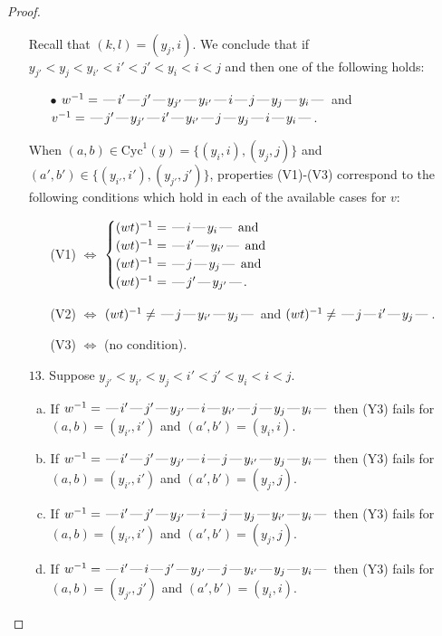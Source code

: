 \documentclass[10pt]{article}
\theoremstyle{definition}
\theoremstyle{definition}
\def\dash{\text{\hspace{0.5mm}---\hspace{0.5mm}}}
\def\Cyc{\mathrm{Cyc}}
\begin{document}
\begin{proof}
\begin{enumerate}
\begin{enumerate}[(a)]
\end{enumerate}
Recall that $(k,l) = (y_j,i)$.
We conclude that if $y_{j'} < y_j < y_{i'} < i' < j' < y_i < i < j$ and then one of the following holds:
\begin{enumerate}
\item[$\bullet$] $w^{-1} = \dash i'\dash j'\dash y_{j'}\dash y_{i'}\dash i\dash j\dash y_j\dash y_i\dash $ and $v^{-1} = \dash j'\dash y_{j'}\dash i'\dash y_{i'}\dash j\dash y_j\dash i\dash y_i\dash $.
\end{enumerate}
When $(a,b)\in\Cyc^1(y)=\{(y_i,i),(y_j,j)\}$ and $(a',b')\in\{(y_{i'},i'),(y_{j'},j')\}$,
properties (V1)-(V3) correspond to the following conditions which hold in
each of the available cases for $v$:
\begin{enumerate}
\item[](V1) $\Leftrightarrow$ $\begin{cases}\text{$(wt)^{-1} = \dash i \dash y_i \dash$}\text{ and }\\
\text{$(wt)^{-1} = \dash i' \dash y_{i'} \dash$}\text{ and }\\
\text{$(wt)^{-1} = \dash j \dash y_j \dash$}\text{ and }\\
\text{$(wt)^{-1} = \dash j' \dash y_{j'} \dash$}.\end{cases}$
\item[](V2) $\Leftrightarrow$ $(wt)^{-1} \neq \dash j \dash y_{i'} \dash y_j \dash$ and $(wt)^{-1}\neq \dash j \dash i' \dash y_j \dash$.
\item[](V3) $\Leftrightarrow$ (no condition).
\end{enumerate}
\item[$13$.] Suppose $y_{j'} < y_{i'} < y_j < i' < j' < y_i < i < j$.
\begin{enumerate}[(a)]
\item If $w^{-1} = \dash i'\dash j'\dash y_{j'}\dash i\dash y_{i'}\dash j\dash y_j\dash y_i\dash $ then (Y3) fails for $(a,b)=(y_{i'},i')$ and $(a',b')=(y_i,i)$.
\item If $w^{-1} = \dash i'\dash j'\dash y_{j'}\dash i\dash j\dash y_{i'}\dash y_j\dash y_i\dash $ then (Y3) fails for $(a,b)=(y_{i'},i')$ and $(a',b')=(y_j,j)$.
\item If $w^{-1} = \dash i'\dash j'\dash y_{j'}\dash i\dash j\dash y_j\dash y_{i'}\dash y_i\dash $ then (Y3) fails for $(a,b)=(y_{i'},i')$ and $(a',b')=(y_j,j)$.
\item If $w^{-1} = \dash i'\dash i\dash j'\dash y_{j'}\dash j\dash y_{i'}\dash y_j\dash y_i\dash $ then (Y3) fails for $(a,b)=(y_{j'},j')$ and $(a',b')=(y_i,i)$.

\end{enumerate}
\end{enumerate}
\end{proof}
\end{document}
